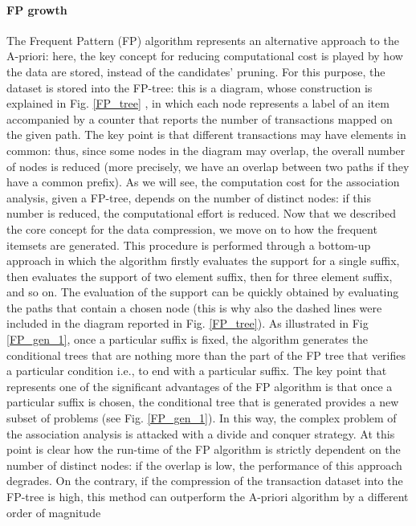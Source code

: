 \documentclass[12pt,%
               a4paper,%
               oneside,openany,%
               titlepage,%
               headinclude,footinclude,%
               BCOR5mm,%
               cleardoublepage=empty,%
               tablecaptionabove,%
               floatperchapter,
               ]{scrreprt}                 %
\begin{document}
\paragraph{FP growth}

The Frequent Pattern (FP) algorithm represents an alternative approach to the A-priori: here, the key concept for reducing computational cost is played by how the data are stored, instead of the candidates' pruning. For this purpose, the dataset is stored into the FP-tree: this is a diagram, whose construction is explained in Fig. \ref{FP_tree} ,  in which each node represents a label of an item accompanied by a counter that reports the number of transactions mapped on the given path. The key point is that different transactions may have elements in common: thus, since some nodes in the diagram may overlap, the overall number of nodes is reduced (more precisely, we have an overlap between two paths if they have a common prefix). As we will see, the computation cost for the association analysis, given a FP-tree, depends on the number of distinct nodes: if this number is reduced, the computational effort is reduced.  Now that we described the core concept for the data compression, we move on to how the frequent itemsets are generated. This procedure is performed through a bottom-up approach in which the algorithm firstly evaluates the support for a single suffix, then evaluates the support of two element suffix, then for three element suffix, and so on. The evaluation of the support can be quickly obtained by evaluating the paths that contain a chosen node (this is why also the dashed lines were included in the diagram reported in Fig. \ref{FP_tree}). As illustrated in Fig \ref{FP_gen_1}, once a particular suffix is fixed, the algorithm generates the conditional trees that are nothing more than the part of the FP tree that verifies a particular condition i.e., to end with a particular suffix. The key point that represents one of the significant advantages of the FP algorithm is that once a particular suffix is chosen, the conditional tree that is generated provides a new subset of problems (see Fig. \ref{FP_gen_1}). In this way, the complex problem of the association analysis is attacked with a divide and conquer strategy. At this point is clear how the run-time of the FP algorithm is strictly dependent on the number of distinct nodes: if the overlap is low, the performance of this approach degrades. On the contrary, if the compression of the transaction dataset into the FP-tree is high, this method can outperform the A-priori algorithm by a different order of magnitude \cite{tan2019introduction}
\end{document}
